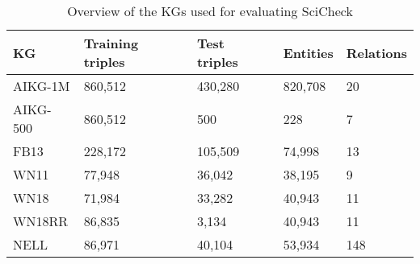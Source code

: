 \begin{table}[!htp]
    \begin{center}
    \begin{tabular}{ >{\raggedright\arraybackslash}M{2.5cm} | M{1.75cm} | M{1.75cm} | M{1.5cm} | M{1.5cm} }
    \hline\rule{0pt}{12pt}
    \textbf{KG} & \textbf{Training triples} & \textbf{Test triples} & \textbf{Entities} & \textbf{Relations} \\
    
    \hline%
    AIKG-1M & 860,512 & 430,280 & 820,708 & 20 \\ 
    AIKG-500 & 860,512 & 500 & 228 & 7 \\ 
    FB13 & 228,172 & 105,509 & 74,998 & 13 \\ 
    WN11 & 77,948 & 36,042 & 38,195 & 9 \\
    WN18 & 71,984 & 33,282 & 40,943 & 11 \\
    WN18RR & 86,835 & 3,134 & 40,943 & 11 \\
    NELL & 86,971 & 40,104 & 53,934 & 148  \\ \hline
    \end{tabular}
    \caption{Overview of the KGs used for evaluating SciCheck}
    \label{table:sci-dsets}
    \end{center}
\end{table}
    